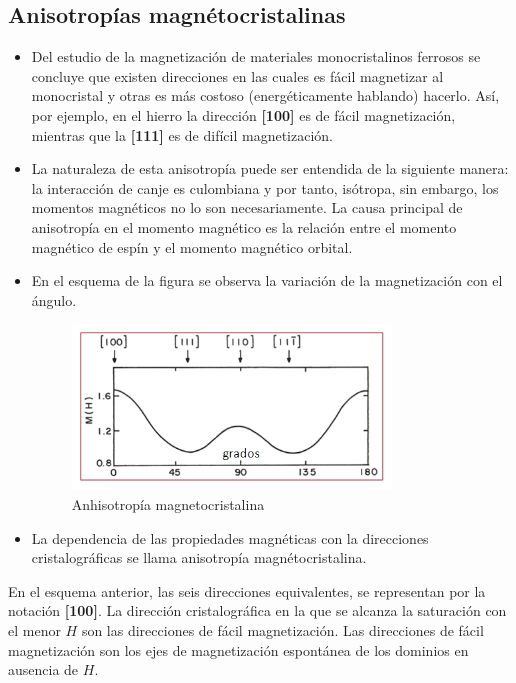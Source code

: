 \subsection{Anisotropías magnétocristalinas}

\begin{itemize}
	\item Del estudio de la magnetización de materiales monocristalinos ferrosos se concluye que existen direcciones en las cuales es fácil magnetizar al monocristal y otras es más costoso (energéticamente hablando) hacerlo. Así, por ejemplo, en el hierro la dirección \textbf{[100]} es de fácil magnetización, mientras que la \textbf{[111]} es de difícil magnetización.

	\item La naturaleza de esta anisotropía puede ser entendida de la siguiente manera: la interacción de canje es culombiana y por tanto, isótropa, sin embargo, los momentos magnéticos no lo son necesariamente. La causa principal de anisotropía en el momento magnético es la relación entre el momento magnético de espín y el momento magnético orbital.
	
	\item En el esquema de la figura se observa la variación de la magnetización con el ángulo.
	
	
\begin{figure}[H]
    \centering
    \includegraphics[width=0.8\textwidth]{./Figures/anhisotropiaMagnetocristalina}
	\caption{Anhisotropía magnetocristalina}
	\label{fig:anhisotropiaMagnetocristalina}
\end{figure}
	
	
	\item La dependencia de las propiedades magnéticas con la direcciones cristalográficas se llama anisotropía magnétocristalina.

\end{itemize}


En el esquema anterior, las seis direcciones equivalentes, se representan por la notación \textbf{[100]}. La dirección cristalográfica en la que se alcanza la saturación con el menor $H$ son las direcciones de fácil magnetización. Las direcciones de fácil magnetización son los ejes de magnetización espontánea de los dominios en ausencia de $H$.

